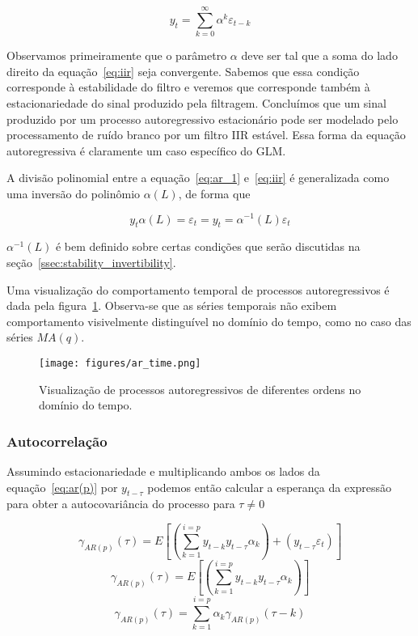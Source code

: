 \begin{equation}\label{eq:iir}
    y_t = \sum^{\infty}_{k=0} \alpha^k \varepsilon_{t-k}
\end{equation}

Observamos primeiramente que o parâmetro $\alpha$ deve ser tal que a soma do
lado direito da equação~\ref{eq:iir} seja convergente. Sabemos que essa
condição corresponde à estabilidade do filtro e veremos que corresponde também
à estacionariedade do sinal produzido pela filtragem. Concluímos que um sinal
produzido por um processo autoregressivo estacionário pode ser modelado pelo
processamento de ruído branco por um filtro IIR estável. Essa forma da
equação autoregressiva é claramente um caso específico do GLM.

A divisão polinomial entre a equação~\ref{eq:ar_1} e~\ref{eq:iir} é generalizada
como uma inversão do polinômio $\alpha(L)$, de forma que

$$ y_t\alpha(L) = \varepsilon_t = y_t = \alpha^{-1}(L)\varepsilon_t$$

$\alpha^{-1}(L)$ é bem definido sobre certas condições que serão discutidas na
seção~\ref{ssec:stability_invertibility}.

Uma visualização do comportamento temporal de processos autoregressivos é dada
pela figura~\ref{fig:ar_time_visualization}. Observa-se que as séries temporais
não exibem comportamento visivelmente distinguível no domínio do tempo, como
no caso das séries $MA(q)$.

\begin{figure}[H]
    \centering
    \texttt{[image: figures/ar\_time.png]}
    \caption{Visualização de processos autoregressivos de diferentes ordens
    no domínio do tempo.}
    \label{fig:ar_time_visualization}
\end{figure}

\subsubsection{Autocorrelação}

Assumindo estacionariedade e multiplicando ambos os lados da
equação~\ref{eq:ar(p)} por $y_{t-\tau}$ podemos então calcular a esperança da
expressão para obter a autocovariância do processo para $\tau \neq 0$

$$ \gamma_{AR(p)}(\tau) = E\left[\left(\sum^{i=p}_{k=1} y_{t-k}y_{t-\tau}\alpha_k\right) + (y_{t-\tau}\varepsilon_t)\right] $$
$$ \gamma_{AR(p)}(\tau) = E\left[\left(\sum^{i=p}_{k=1} y_{t-k}y_{t-\tau}\alpha_k\right)\right] $$
$$ \gamma_{AR(p)}(\tau) = \sum^{i=p}_{k=1} \alpha_k \gamma_{AR(p)}(\tau - k) $$

